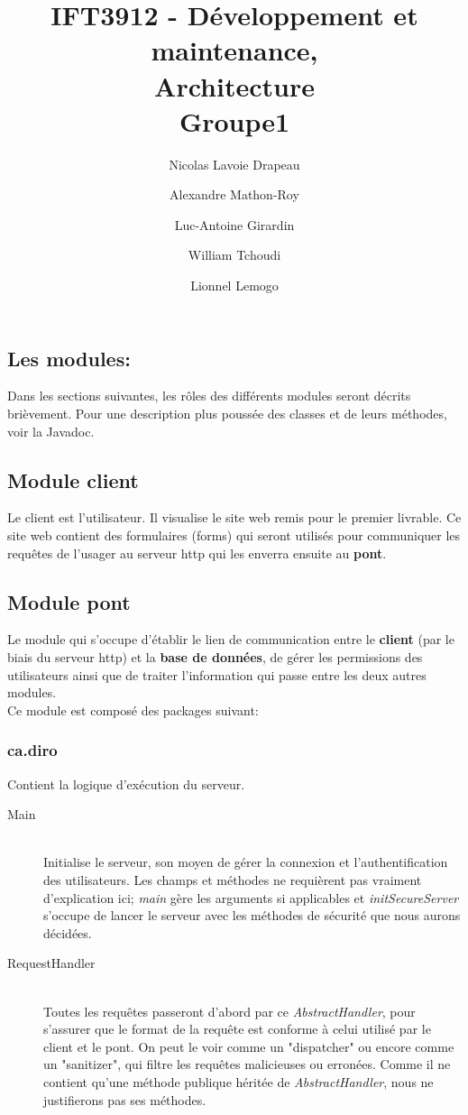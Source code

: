 \documentclass[10pt,a4paper]{report}
\author{Nicolas Lavoie Drapeau \and Alexandre Mathon-Roy \and Luc-Antoine Girardin \and William Tchoudi \and Lionnel Lemogo}
\title{IFT3912 - Développement et maintenance,\\Architecture\\Groupe1}
\begin{document}
\maketitle
\begin{flushleft}
\section{Les modules:}
Dans les sections suivantes, les rôles des différents modules seront décrits brièvement. Pour une description plus poussée des classes et de leurs méthodes, voir la Javadoc.\\
\bigskip
\subsection{Module client}
Le client est l'utilisateur. Il visualise le site web remis pour le premier livrable. Ce site web contient des formulaires (forms) qui seront utilisés pour communiquer les requêtes de l'usager au serveur http qui les enverra ensuite au \textbf{pont}.\\
\bigskip
\subsection{Module pont}
Le module qui s'occupe d'établir le lien de communication entre le \textbf{client} (par le biais du serveur http) et la \textbf{base de données}, de gérer les permissions des utilisateurs ainsi que de traiter l'information qui passe entre les deux autres modules.\\
\medskip
Ce module est composé des packages suivant:\\
\bigskip
\subsubsection*{ca.diro}
Contient la logique d'exécution du serveur.\\
\bigskip
\begin{description}
\item[Main] \hfill \\ Initialise le serveur, son moyen de gérer la connexion et l'authentification des utilisateurs. Les champs et méthodes ne requièrent pas vraiment d'explication ici; \emph{main} gère les arguments si applicables et \textit{initSecureServer} s'occupe de lancer le serveur avec les méthodes de sécurité que nous aurons décidées.\\
\item[RequestHandler] \hfill \\ Toutes les requêtes passeront d'abord par ce \emph{AbstractHandler}, pour s'assurer que le format de la requête est conforme à celui utilisé par le client et le pont. On peut le voir comme un "dispatcher" ou encore comme un "sanitizer", qui filtre les requêtes malicieuses ou erronées. Comme il ne contient qu'une méthode publique héritée de \emph{AbstractHandler}, nous ne justifierons pas ses méthodes.\\
\end{description}
\bigskip

\end{flushleft}
\end{document}
